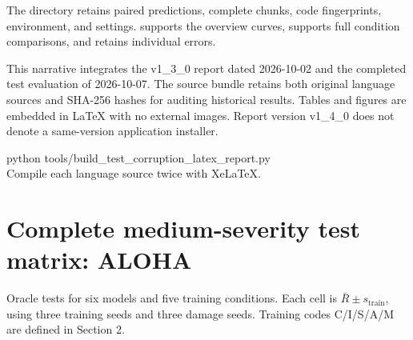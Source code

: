\documentclass[11pt,a4paper]{article}
\begin{document}
The directory  retains paired predictions, complete chunks, code fingerprints, environment, and settings.  supports the overview curves,  supports full condition comparisons, and  retains individual errors.

This narrative integrates the v1\_3\_0 report dated 2026-10-02 and the completed test evaluation of 2026-10-07. The source bundle retains both original language sources and SHA-256 hashes for auditing historical results. Tables and figures are embedded in LaTeX with no external images. Report version v1\_4\_0 does not denote a same-version application installer.

\begin{tcolorbox}[colback=panel,colframe=rule]\small\ttfamily
python tools/build\_test\_corruption\_latex\_report.py\\
Compile each language source twice with XeLaTeX.
\end{tcolorbox}
\endgroup
\appendix
\clearpage\section{Complete medium-severity test matrix: ALOHA}
Oracle tests for six models and five training conditions. Each cell is $\bar R\pm s_{\mathrm{train}}$, using three training seeds and three damage seeds. Training codes C/I/S/A/M are defined in Section 2.
\end{document}
